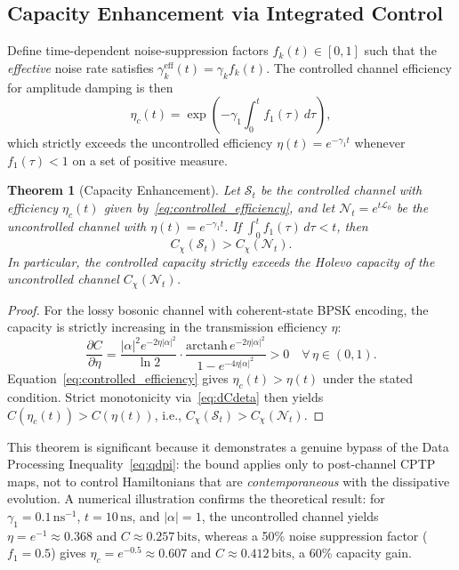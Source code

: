 \documentclass[journal,twocolumn]{IEEEtran}
\theoremstyle{definition}
\theoremstyle{plain}
\newtheorem{theorem}{Theorem}[section]
\begin{document}
\subsection{Capacity Enhancement via Integrated Control}

Define time-dependent noise-suppression factors $f_k(t) \in [0,1]$
such that the \emph{effective} noise rate satisfies
$\gamma_k^{\mathrm{eff}}(t) = \gamma_k f_k(t)$.  The controlled
channel efficiency for amplitude damping is then
\begin{equation}
  \eta_c(t) = \exp\!\left(-\gamma_1 \int_0^t f_1(\tau)\,d\tau\right),
  \label{eq:controlled_efficiency}
\end{equation}
which strictly exceeds the uncontrolled efficiency
$\eta(t) = e^{-\gamma_1 t}$ whenever $f_1(\tau) < 1$ on a set of
positive measure.

\begin{theorem}[Capacity Enhancement]
\label{thm:capacity_enhancement}
Let $\mathcal{S}_t$ be the controlled channel with efficiency
$\eta_c(t)$ given by~\eqref{eq:controlled_efficiency}, and let
$\mathcal{N}_t = e^{t\mathcal{L}_0}$ be the uncontrolled channel
with $\eta(t) = e^{-\gamma_1 t}$.  If $\int_0^t f_1(\tau)\,d\tau < t$,
then
\begin{equation}
  C_\chi(\mathcal{S}_t) > C_\chi(\mathcal{N}_t).
  \label{eq:cap_enhancement}
\end{equation}
In particular, the controlled capacity strictly exceeds the Holevo
capacity of the uncontrolled channel $C_\chi(\mathcal{N}_t)$.
\end{theorem}

\begin{proof}
For the lossy bosonic channel with coherent-state BPSK encoding,
the capacity is strictly increasing in the transmission efficiency
$\eta$:
\begin{equation}
  \frac{\partial C}{\partial\eta} =
  \frac{|\alpha|^2 e^{-2\eta|\alpha|^2}}{\ln 2} \cdot
  \frac{\mathrm{arctanh}\, e^{-2\eta|\alpha|^2}}
       {1 - e^{-4\eta|\alpha|^2}} > 0
  \quad \forall\, \eta \in (0,1).
  \label{eq:dCdeta}
\end{equation}
Equation~\eqref{eq:controlled_efficiency} gives $\eta_c(t) > \eta(t)$
under the stated condition.  Strict monotonicity
via~\eqref{eq:dCdeta} then yields
$C(\eta_c(t)) > C(\eta(t))$, i.e., $C_\chi(\mathcal{S}_t) >
C_\chi(\mathcal{N}_t)$.
\end{proof}

This theorem is significant because it demonstrates a genuine
bypass of the Data Processing Inequality~\eqref{eq:qdpi}: the
bound applies only to post-channel CPTP maps, not to control
Hamiltonians that are \emph{contemporaneous} with the dissipative
evolution.  A numerical illustration confirms the theoretical
result: for $\gamma_1 = 0.1\,\mathrm{ns}^{-1}$, $t =
10\,\mathrm{ns}$, and $|\alpha|=1$, the uncontrolled channel yields
$\eta = e^{-1} \approx 0.368$ and $C \approx 0.257\,\mathrm{bits}$,
whereas a 50\% noise suppression factor ($f_1 = 0.5$) gives
$\eta_c = e^{-0.5} \approx 0.607$ and $C \approx 0.412\,\mathrm{bits}$,
a 60\% capacity gain.
\end{document}
